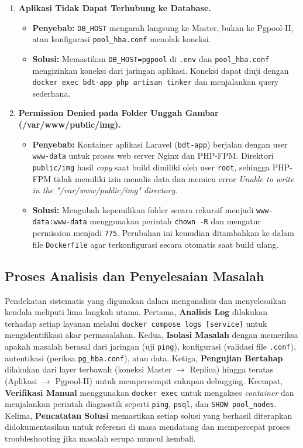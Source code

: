 \begin{enumerate}
    \item \textbf{Aplikasi Tidak Dapat Terhubung ke Database.}
    \begin{itemize}
        \item \textbf{Penyebab:} \texttt{DB\_HOST} mengarah langsung
        ke Master, bukan ke Pgpool-II, atau konfigurasi
        \texttt{pool\_hba.conf} menolak koneksi.
        \item \textbf{Solusi:} Memastikan \texttt{DB\_HOST=pgpool} di
        \texttt{.env} dan \texttt{pool\_hba.conf} mengizinkan koneksi
        dari jaringan aplikasi. Koneksi dapat diuji dengan
        \texttt{docker exec bdt-app php artisan tinker} dan
        menjalankan query sederhana.
    \end{itemize}

    \item \textbf{Permission Denied pada Folder Unggah Gambar (/var/www/public/img).}
    \begin{itemize}
        \item \textbf{Penyebab:} Kontainer aplikasi Laravel (\texttt{bdt-app})
        berjalan dengan user \texttt{www-data} untuk proses web server Nginx
        dan PHP-FPM. Direktori \texttt{public/img} hasil \textit{copy} saat build
        dimiliki oleh user \texttt{root}, sehingga PHP-FPM tidak memiliki izin
        menulis data dan memicu error \textit{Unable to write in the "/var/www/public/img" directory}.
        \item \textbf{Solusi:} Mengubah kepemilikan folder secara rekursif menjadi
        \texttt{www-data:www-data} menggunakan perintah \texttt{chown -R} dan
        mengatur permission menjadi \texttt{775}. Perubahan ini kemudian ditambahkan
        ke dalam file \texttt{Dockerfile} agar terkonfigurasi secara otomatis saat build ulang.
    \end{itemize}
\end{enumerate}

\subsection{Proses Analisis dan Penyelesaian Masalah}

Pendekatan sistematis yang digunakan dalam menganalisis dan
menyelesaikan kendala meliputi lima langkah utama. Pertama,
\textbf{Analisis Log} dilakukan terhadap setiap layanan melalui
\texttt{docker compose logs [service]} untuk mengidentifikasi akar
permasalahan. Kedua, \textbf{Isolasi Masalah} dengan memeriksa apakah
masalah berasal dari jaringan (uji \texttt{ping}), konfigurasi
(validasi file \texttt{.conf}), autentikasi (periksa
\texttt{pg\_hba.conf}), atau data. Ketiga, \textbf{Pengujian
Bertahap} dilakukan dari layer terbawah (koneksi Master $\rightarrow$
Replica) hingga teratas (Aplikasi $\rightarrow$ Pgpool-II) untuk
mempersempit cakupan debugging. Keempat, \textbf{Verifikasi Manual}
menggunakan \texttt{docker exec} untuk mengakses \textit{container}
dan menjalankan perintah diagnostik seperti \texttt{ping},
\texttt{psql}, dan \texttt{SHOW pool\_nodes}. Kelima,
\textbf{Pencatatan Solusi} memastikan setiap solusi yang berhasil
diterapkan didokumentasikan untuk referensi di masa mendatang dan
mempercepat proses troubleshooting jika masalah serupa muncul kembali.
